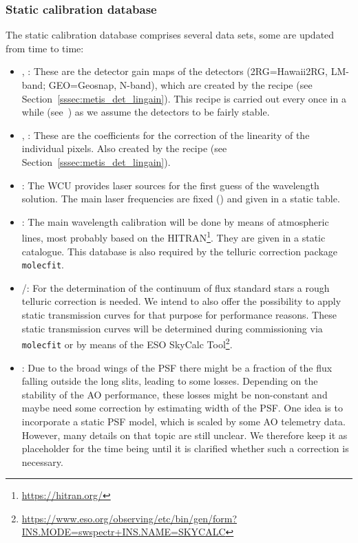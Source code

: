 \subsubsection{Static calibration database}\label{lss:static_calib}
The static calibration database comprises several data sets, some are updated from time to time:
\begin{itemize}
    \item {}, : These are the detector gain maps of the detectors (2RG=Hawaii2RG, LM-band; GEO=Geosnap, N-band), which are created by the recipe  (see Section~\ref{sssec:metis_det_lingain}). This recipe is carried out every once in a while (see~\cite{METIS-calibration_plan}) as we assume the detectors to be fairly stable.
    \item {}, : These are the coefficients for the correction of the linearity of the individual pixels. Also created by the recipe  (see Section~\ref{sssec:metis_det_lingain}). 
    \item {}: The \ac{WCU} provides laser sources for the first guess of the wavelength solution. The main laser frequencies are fixed (\cite{METIS-calibration_plan}) and given in a static table.
    \item {}: The main wavelength calibration will be done by means of atmospheric lines, most probably based on the \ac{HITRAN}\footnote{\url{https://hitran.org/}}. They are given in a static catalogue. This database is also required by the telluric correction package \texttt{molecfit}.
    \item {}/: For the determination of the continuum of flux standard stars a rough telluric correction is needed. We intend to also offer the possibility to apply static transmission curves for that purpose for performance reasons. These static transmission curves will be determined during commissioning via \texttt{molecfit} or by means of the ESO SkyCalc Tool\footnote{\url{https://www.eso.org/observing/etc/bin/gen/form?INS.MODE=swspectr+INS.NAME=SKYCALC}}.
    \item {}: Due to the broad wings of the \ac{PSF} there might be a fraction of the flux falling outside the long slits, leading to some losses. Depending on the stability of the \ac{AO} performance, these losses might be non-constant and maybe need some correction by estimating width of the \ac{PSF}. One idea is to incorporate a static \ac{PSF} model, which is scaled by some \ac{AO} telemetry data. However, many details on that topic are still unclear. We therefore keep it as placeholder for the time being until it is clarified whether such a correction is necessary.

\end{itemize}
